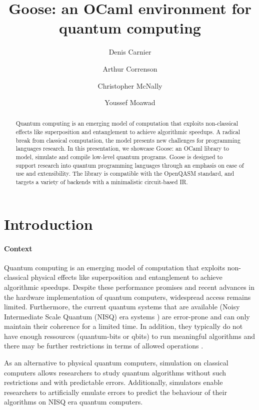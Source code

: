 \documentclass[a4paper]{easychair}
\title{Goose: an OCaml environment for quantum computing}
\author{
  Denis Carnier\inst{1}
  \and
  Arthur Correnson\inst{2}
  \and
  Christopher McNally\inst{3}
  \and
  Youssef Moawad\inst{4}
}
\institute{
  imec-DistriNet, KU Leuven
\and
  Ecole Normale Sup\'erieure de Rennes
\and
  Massachusetts Institute of Technology
\and
  University of Glasgow
}
\begin{document}
\maketitle

\begin{abstract}
Quantum computing is an emerging model of computation that exploits non-classical effects like superposition and entanglement to achieve algorithmic speedups. A radical break from classical computation, the model presents new challenges for programming languages research. In this presentation, we showcase Goose: an OCaml library to model, simulate and compile low-level quantum programs. Goose is designed to support research into quantum programming languages through an emphasis on ease of use and extensibility. The library is compatible with the OpenQASM standard, and targets a variety of backends with a minimalistic circuit-based IR.
\end{abstract}

\section{Introduction}

\paragraph*{Context}

Quantum computing \cite{Chuang2010} is an emerging model of computation that exploits non-classical physical effects like superposition and entanglement to achieve algorithmic speedups. Despite these performance promises and recent advances in the hardware implementation of quantum computers, widespread access remains limited. Furthermore, the current quantum systems that are available (Noisy Intermediate Scale Quantum (NISQ) era systems \cite{Preskill2018}) are error-prone and can only maintain their coherence for a limited time. In addition, they typically do not have enough ressources (quantum-bits or qbits) to run meaningful algorithms and there may be further restrictions in terms of allowed operations \cite{Gyongyosi2019}.

As an alternative to physical quantum computers, simulation on classical computers allows researchers to study quantum algorithms without such restrictions and with predictable errors. Additionally, simulators enable researchers to artificially emulate errors to predict the behaviour of their algorithms on NISQ era quantum computers.
\end{document}
